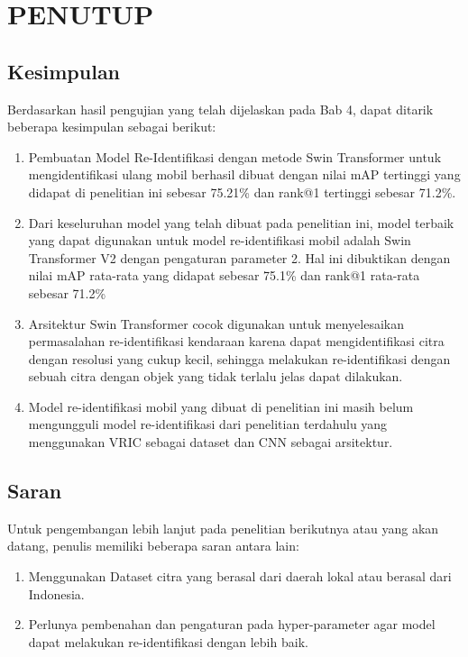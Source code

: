 \chapter{PENUTUP}
\label{chap:penutup}


\section{Kesimpulan}
\label{sec:kesimpulan}

Berdasarkan hasil pengujian yang telah dijelaskan pada Bab 4, dapat 
ditarik beberapa kesimpulan sebagai berikut:

\begin{enumerate}[nolistsep]

  \item Pembuatan Model Re-Identifikasi dengan metode Swin Transformer untuk 
  mengidentifikasi ulang mobil berhasil dibuat dengan nilai mAP tertinggi yang didapat 
  di penelitian ini sebesar 75.21\% dan rank@1 tertinggi sebesar 71.2\%.

  \item Dari keseluruhan model yang telah dibuat pada penelitian ini, 
  model terbaik yang dapat digunakan untuk model re-identifikasi mobil adalah 
  Swin Transformer V2 dengan pengaturan parameter 2. Hal ini dibuktikan dengan nilai 
  mAP rata-rata yang didapat sebesar 75.1\% dan rank@1 rata-rata sebesar 71.2\%

  \item Arsitektur Swin Transformer cocok digunakan untuk menyelesaikan permasalahan 
  re-identifikasi kendaraan karena dapat mengidentifikasi citra dengan resolusi yang cukup 
  kecil, sehingga melakukan re-identifikasi dengan sebuah citra dengan objek yang 
  tidak terlalu jelas dapat dilakukan.

  \item Model re-identifikasi mobil yang dibuat di penelitian ini masih belum mengungguli 
  model re-identifikasi dari penelitian terdahulu yang menggunakan VRIC sebagai dataset 
  dan CNN sebagai arsitektur.

\end{enumerate}

\section{Saran}
\label{chap:saran}

Untuk pengembangan lebih lanjut pada penelitian berikutnya atau yang akan datang, \linebreak
penulis memiliki beberapa saran antara lain:

\begin{enumerate}[nolistsep]

  \item Menggunakan Dataset citra yang berasal dari daerah lokal atau berasal dari Indonesia.

  \item Perlunya pembenahan dan pengaturan pada hyper-parameter agar model dapat melakukan 
  re-identifikasi dengan lebih baik.

\end{enumerate}
